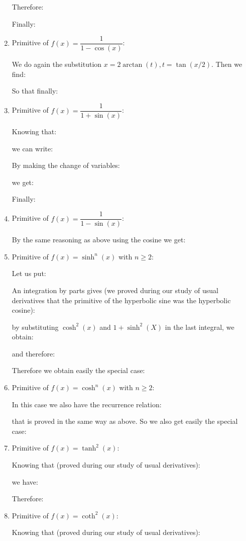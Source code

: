 \begin{enumerate}
		Therefore:
		
		Finally:
		
		\item  Primitive of $f(x)=\dfrac{1}{1-\cos(x)}$:
		
		We do again the substitution $x=2\arctan(t),t=\tan(x/2)$. Then we find:
		
		So that finally:
		
		\item  Primitive of $f(x)=\dfrac{1}{1+\sin(x)}$:
		
		Knowing that:
		
		we can write:
		
		By making the change of variables:
		
		we get:
		
		Finally:
		
		\item  Primitive of $f(x)=\dfrac{1}{1-\sin(x)}$:
		
		By the same reasoning as above using the cosine we get:
		
		
		\item Primitive of $f(x)=\sinh^n(x)$ with $n \geq 2$:
		
		Let us put:
		
		An integration by parts gives (we proved during our study of usual derivatives that the primitive of the hyperbolic sine was the hyperbolic cosine):
		
		by substituting $\cosh^2(x)$  and $1+\sinh^2(X)$ in the last integral, we obtain:
		
		and therefore:
		
		Therefore we obtain easily the special case:
		 
		\item Primitive of $f(x)=\cosh^n(x)$ with $n \geq 2$:
		
		In this case we also have the recurrence relation:
		
		that is proved in the same way as above. So we also get easily the special case:
		
		
		\item Primitive of $f(x)=\tanh^2(x)$:
		
		Knowing that (proved during our study of usual derivatives):
		
		we have:
		
		Therefore:
		
		
		\item Primitive of $f(x)=\coth^2(x)$:
		
		Knowing that (proved during our study of usual derivatives):
		

\end{enumerate}
